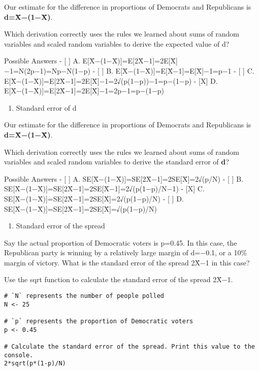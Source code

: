 \documentclass[
]{article}
\providecommand{\tightlist}{%
  \setlength{\itemsep}{0pt}\setlength{\parskip}{0pt}}
\begin{document}
Our estimate for the difference in proportions of Democrats and
Republicans is \textbf{d=X̄−(1−X̄)}.

Which derivation correctly uses the rules we learned about sums of
random variables and scaled random variables to derive the expected
value of d?

Possible Answers - {[} {]} A.
E{[}X̄−(1−X̄){]}=E{[}2X̄−1{]}=2E{[}X̄{]}−1=N(2p−1)=Np−N(1−p) - {[} {]} B.
E{[}X̄−(1−X̄){]}=E{[}X̄−1{]}=E{[}X̄{]}−1=p−1 - {[} {]} C.
E{[}X̄−(1−X̄){]}=E{[}2X̄−1{]}=2E{[}X̄{]}−1=2√(p(1−p))−1=p−(1−p) - {[}X{]} D.
E{[}X̄−(1−X̄){]}=E{[}2X̄−1{]}=2E{[}X̄{]}−1=2p−1=p−(1−p)

\begin{enumerate}
\def\labelenumi{\arabic{enumi}.}
\setcounter{enumi}{7}
\tightlist
\item
  Standard error of d
\end{enumerate}

Our estimate for the difference in proportions of Democrats and
Republicans is \textbf{d=X̄−(1−X̄)}.

Which derivation correctly uses the rules we learned about sums of
random variables and scaled random variables to derive the standard
error of \textbf{d}?

Possible Answers - {[} {]} A.
SE{[}X̄−(1−X̄){]}=SE{[}2X̄−1{]}=2SE{[}X̄{]}=2√(p/N) - {[} {]} B.
SE{[}X̄−(1−X̄){]}=SE{[}2X̄−1{]}=2SE{[}X̄−1{]}=2√(p(1−p)/N−1) - {[}X{]} C.
SE{[}X̄−(1−X̄){]}=SE{[}2X̄−1{]}=2SE{[}X̄{]}=2√(p(1−p)/N) - {[} {]} D.
SE{[}X̄−(1−X̄){]}=SE{[}2X̄−1{]}=2SE{[}X̄{]}=√(p(1−p)/N)

\begin{enumerate}
\def\labelenumi{\arabic{enumi}.}
\setcounter{enumi}{8}
\tightlist
\item
  Standard error of the spread
\end{enumerate}

Say the actual proportion of Democratic voters is p=0.45. In this case,
the Republican party is winning by a relatively large margin of d=−0.1,
or a 10\% margin of victory. What is the standard error of the spread
2X̄−1 in this case?

Use the sqrt function to calculate the standard error of the spread
2X̄−1.

\begin{verbatim}
# `N` represents the number of people polled
N <- 25

# `p` represents the proportion of Democratic voters
p <- 0.45

# Calculate the standard error of the spread. Print this value to the console.
2*sqrt(p*(1-p)/N)
\end{verbatim}
\end{document}

